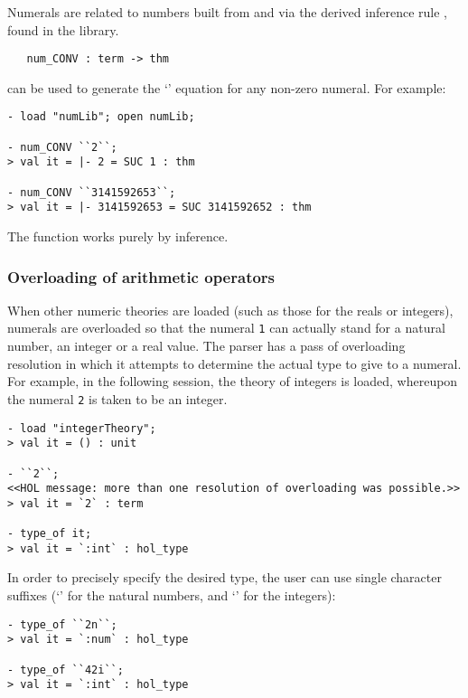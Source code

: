 Numerals are related to numbers built from  and 
via the derived inference rule , found in the
 library.

\begin{boxed}
\begin{verbatim}
   num_CONV : term -> thm
\end{verbatim}
\end{boxed}

\noindent {} can be used to generate the `'
equation for any non-zero numeral.  For example:

\begin{boxed}
\begin{verbatim}
- load "numLib"; open numLib;

- num_CONV ``2``;
> val it = |- 2 = SUC 1 : thm

- num_CONV ``3141592653``;
> val it = |- 3141592653 = SUC 3141592652 : thm
\end{verbatim}
\end{boxed}

\noindent The  function works purely by inference.

\subsubsection{Overloading of arithmetic operators}
\label{arith-overloading}

When other numeric theories are loaded (such as those for the reals or
integers), numerals are overloaded so that the numeral {\small\verb+1+} can
actually stand for a natural number, an integer or a real value. The
parser has a pass of overloading resolution in which it attempts to
determine the actual type to give to a numeral. For example, in the
following session, the theory of integers is loaded, whereupon the
numeral \verb+2+ is taken to be an integer.
%
\setcounter{sessioncount}{0}
\begin{session}
{\small
\begin{verbatim}
- load "integerTheory";
> val it = () : unit

- ``2``;
<<HOL message: more than one resolution of overloading was possible.>>
> val it = `2` : term

- type_of it;
> val it = `:int` : hol_type
\end{verbatim}
}
\end{session}

 In order to precisely specify the desired type, the user can use single
character suffixes (`' for the natural numbers, and `' for
the integers):
\begin{session}
{\small
\begin{verbatim}
- type_of ``2n``;
> val it = `:num` : hol_type

- type_of ``42i``;
> val it = `:int` : hol_type
\end{verbatim}
}
\end{session}

